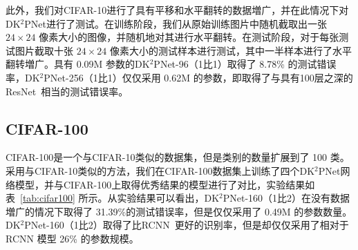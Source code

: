 此外，我们对CIFAR-10进行了具有平移和水平翻转的数据増广，并在此情况下对DK$^2$PNet进行了测试。在训练阶段，我们从原始训练图片中随机截取出一张 $24\times24$ 像素大小的图像，并随机地对其进行水平翻转。在测试阶段，对于每张测试图片截取十张 $24\times24$ 像素大小的测试样本进行测试，其中一半样本进行了水平翻转増广。具有 0.09M 参数的DK$^2$PNet-96（1比1）取得了 8.78\% 的测试错误率，DK$^2$PNet-256（1比1）仅仅采用 0.62M 的参数，即取得了与具有100层之深的ResNet~\cite{he2015deep}相当的测试错误率。

\subsection{CIFAR-100}
\label{sec:acc:experiment:cifar100}

CIFAR-100是一个与CIFAR-10类似的数据集，但是类别的数量扩展到了 100 类。采用与CIFAR-10类似的方法，我们在CIFAR-100数据集上训练了四个DK$^2$PNet网络模型，并与CIFAR-100上取得优秀结果的模型进行了对比，实验结果如表~\ref{tab:cifar100} 所示。从实验结果可以看出，DK$^2$PNet-160（1比2）在没有数据増广的情况下取得了 31.39\%的测试错误率，但是仅仅采用了 0.49M 的参数数量。DK$^2$PNet-160（1比2）取得了比RCNN~\cite{liang2015recurrent}更好的识别率，但是却仅仅采用了相对于RCNN 模型 26\% 的参数规模。

